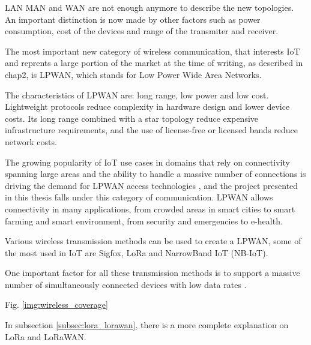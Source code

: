 	LAN MAN and WAN are not enough anymore to describe the new topologies.
	An important distinction is now made by other factors such as power consumption, cost of the devices and range of the transmiter and receiver.
	
	The most important new category of wireless communication, that interests IoT and reprents a large portion of the market at the time of writing, as described in chap2, is LPWAN, which stands for Low Power Wide Area Networks.
	
	The characteristics of LPWAN are: long range, low power and low cost.
	Lightweight protocols reduce complexity in hardware design and lower device costs. Its long range combined with a star topology reduce expensive infrastructure requirements, and the use of license-free or licensed bands reduce network costs.

	The growing popularity of IoT use cases in domains that rely on connectivity spanning large areas and the ability to handle a massive number of connections is driving the demand for LPWAN access technologies \cite{fi12030046}, and the project presented in this thesis falls under this category of communication.
	LPWAN allows connectivity in many applications, from crowded areas in smart cities to smart farming and smart environment, from security and emergencies to e-health.
	
	Various wireless transmission methods can be used to create a LPWAN, some of the most used in IoT are Sigfox, LoRa and NarrowBand IoT (NB-IoT).

	One important factor for all these transmission methods is to support a massive number of simultaneously connected devices with low data rates \cite{fi12030046}.
	
%	
	
	Fig. \ref{img:wireless_coverage} 

	In subsection \ref{subsec:lora_lorawan}, there is a more complete explanation on LoRa and LoRaWAN.
		
	\newpage
		
